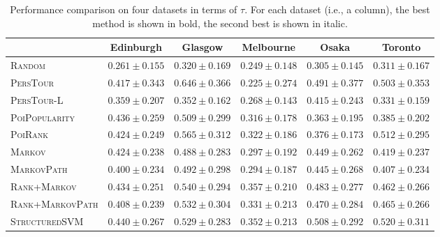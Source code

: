 \begin{table*}
\centering
\begin{tabular}{l|ccccc} \hline
 & Edinburgh & Glasgow & Melbourne & Osaka & Toronto \\ \hline
\textsc{Random} & $0.261\pm0.155$ & $0.320\pm0.169$ & $0.249\pm0.148$ & $0.305\pm0.145$ & $0.311\pm0.167$ \\
\textsc{PersTour}\cite{ijcai15} & $0.417\pm0.343$ & $\mathbf{0.646\pm0.366}$ & $0.225\pm0.274$ & $\mathit{0.491\pm0.377}$ & $0.503\pm0.353$ \\
\textsc{PersTour-L} & $0.359\pm0.207$ & $0.352\pm0.162$ & $0.268\pm0.143$ & $0.415\pm0.243$ & $0.331\pm0.159$ \\
\textsc{PoiPopularity} & $\mathit{0.436\pm0.259}$ & $0.509\pm0.299$ & $0.316\pm0.178$ & $0.363\pm0.195$ & $0.385\pm0.202$ \\
\textsc{PoiRank} & $0.424\pm0.249$ & $\mathit{0.565\pm0.312}$ & $0.322\pm0.186$ & $0.376\pm0.173$ & $\mathit{0.512\pm0.295}$ \\
\textsc{Markov} & $0.424\pm0.238$ & $0.488\pm0.283$ & $0.297\pm0.192$ & $0.449\pm0.262$ & $0.419\pm0.237$ \\
\textsc{MarkovPath} & $0.400\pm0.234$ & $0.492\pm0.298$ & $0.294\pm0.187$ & $0.445\pm0.268$ & $0.407\pm0.234$ \\
\textsc{Rank+Markov} & $0.434\pm0.251$ & $0.540\pm0.294$ & $\mathbf{0.357\pm0.210}$ & $0.483\pm0.277$ & $0.462\pm0.266$ \\
\textsc{Rank+MarkovPath} & $0.408\pm0.239$ & $0.532\pm0.304$ & $0.331\pm0.213$ & $0.470\pm0.284$ & $0.465\pm0.266$ \\
\textsc{StructuredSVM} & $\mathbf{0.440\pm0.267}$ & $0.529\pm0.283$ & $\mathit{0.352\pm0.213}$ & $\mathbf{0.508\pm0.292}$ & $\mathbf{0.520\pm0.311}$ \\
\hline
\end{tabular}
\caption{Performance comparison on four datasets in terms of $\tau$.
         For each dataset (i.e., a column), the best method is shown in bold, the second best is shown in italic.}
\label{table:tau}
\end{table*}


